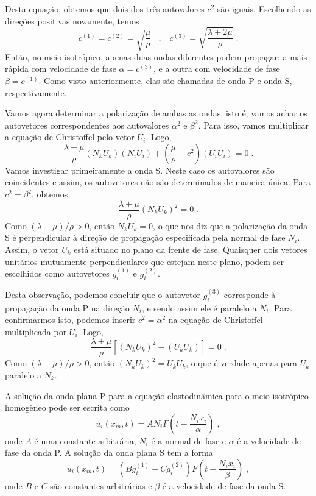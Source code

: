 Desta equa\c{c}\~ao, obtemos que dois dos tr\^es autovalores $c^2$
s\~ao iguais. Escolhendo as dire\c{c}\~oes positivas novamente,
temos
\begin{equation}
c^{(1)}=c^{(2)}=\sqrt{\frac{\mu}{\rho}} \;\;\;,\;\;\; c^{(3)}=
\sqrt{\frac{\lambda+2\mu}{\rho}}\;.
\end{equation}
Ent\~ao, no meio isotr\'opico, apenas duas ondas diferentes podem
propagar: a mais r\'apida com velocidade de fase $\alpha=c^{(3)}$,
e a outra com velocidade de fase $\beta=c^{(1)}$. Como visto
anteriormente, elas s\~ao chamadas de onda P e onda S,
respectivamente.

Vamos agora determinar a polariza\c{c}\~ao de ambas as ondas, isto
\'e, vamos achar os autovetores correspondentes aos autovalores
$\alpha^2$ e $\beta^2$. Para isso, vamos multiplicar a
equa\c{c}\~ao de Christoffel pelo vetor $U_i$. Logo,
\begin{equation}
\frac{\lambda+\mu}{\rho}(N_kU_k)(N_iU_i)+\left(\frac{\mu}{\rho}-c^2
\right)(U_iU_i)=0 \;.
\end{equation}
Vamos investigar primeiramente a onda S. Neste caso os autovalores
s\~ao coincidentes e assim, os autovetores n\~ao s\~ao
determinados de maneira \'unica. Para $c^2 = \beta^2$, obtemos
\begin{equation}
\frac{\lambda+\mu}{\rho}(N_kU_k)^2=0 \;.
\end{equation}
Como $(\lambda+\mu)/\rho>0$, ent\~ao $N_kU_k=0$, o que nos diz que
a polariza\c{c}\~ao da onda S \'e perpendicular \`a dire\c{c}\~ao
de propaga\c{c}\~ao especificada pela normal de fase $N_i$. Assim,
o vetor $U_k$ est\'a situado no plano da frente de fase. Quaisquer
dois vetores unit\'arios mutuamente perpendiculares que estejam
neste plano, podem ser escolhidos como autovetores $g_i^{(1)}$ e
$g_i^{(2)}$.

Desta observa\c{c}\~ao, podemos concluir que o autovetor
$g_i^{(3)}$ corresponde \`a propaga\c{c}\~ao da onda P na
dire\c{c}\~ao $N_i$, e sendo assim ele \'e paralelo a $N_i$. Para
confirmarmos isto, podemos inserir $c^2=\alpha^2$ na equa\c{c}\~ao
de Christoffel multiplicada por $U_i$. Logo,
\begin{equation}
\frac{\lambda+\mu}{\rho}[(N_kU_k)^2-(U_kU_k)]=0 \;.
\end{equation}
Como $(\lambda+\mu)/\rho>0$, ent\~ao $(N_kU_k)^2=U_kU_k$, o que
\'e verdade apenas para $U_k$ paralelo a $N_k$.

A solu\c{c}\~ao da onda plana P para a equa\c{c}\~ao
elastodin\^amica para o meio isotr\'opico homog\^eneo pode ser
escrita como
\begin{equation}
u_i(x_m,t)=AN_iF\left(t-\frac{N_ix_i}{\alpha} \right) \;,
\end{equation}
onde $A$ \'e uma constante arbitr\'aria, $N_i$ \'e a normal de
fase e $\alpha$ \'e a velocidade de fase da onda P. A
solu\c{c}\~ao da onda plana S tem a forma
\begin{equation}
u_i(x_m,t)=(Bg_i^{(1)}+Cg_i^{(2)})F\left(t-\frac{N_ix_i}{\beta}
\right) \;,
\end{equation}
onde $B$ e $C$ s\~ao constantes arbitr\'arias e $\beta$ \'e a
velocidade de fase da onda S.

